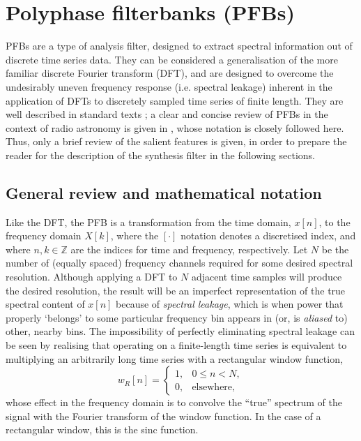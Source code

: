 \documentclass{pasa}%
\begin{document}
\section{Polyphase filterbanks (PFBs)}
\label{sec:pfb}

PFBs are a type of analysis filter, designed to extract spectral information out of discrete time series data.
They can be considered a generalisation of the more familiar discrete Fourier transform (DFT), and are designed to overcome the undesirably uneven frequency response (i.e. spectral leakage) inherent in the application of DFTs to discretely sampled time series of finite length.
They are well described in standard texts \citep{Crochiere1983,Harris2004,Oppenheim2009}; a clear and concise review of PFBs in the context of radio astronomy is given in \citet{Harris2011}, whose notation is closely followed here.
Thus, only a brief review of the salient features is given, in order to prepare the reader for the description of the synthesis filter in the following sections.

\subsection{General review and mathematical notation}

Like the DFT, the PFB is a transformation from the time domain, $x[n]$, to the frequency domain $X[k]$, where the $[\cdot]$ notation denotes a discretised index, and where $n,k \in \mathbb{Z}$ are the indices for time and frequency, respectively.
Let $N$ be the number of (equally spaced) frequency channels required for some desired spectral resolution.
Although applying a DFT to $N$ adjacent time samples will produce the desired resolution, the result will be an imperfect representation of the true spectral content of $x[n]$ because of \textit{spectral leakage}, which is when power that properly `belongs' to some particular frequency bin appears in (or, is \textit{aliased} to) other, nearby bins.
The impossibility of perfectly eliminating spectral leakage can be seen by realising that operating on a finite-length time series is equivalent to multiplying an arbitrarily long time series with a rectangular window function,
\begin{equation}
    w_R[n] = \begin{cases} 1, & 0 \le n < N, \\ 0, & \text{elsewhere}, \end{cases}
\end{equation}
whose effect in the frequency domain is to convolve the ``true'' spectrum of the signal with the Fourier transform of the window function.
In the case of a rectangular window, this is the sinc function.
\end{document}
